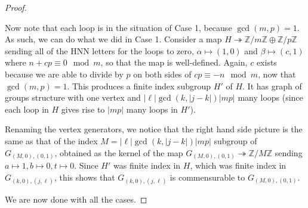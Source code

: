 \documentclass[10pt]{article}
\def\integers{{\mathbb{Z}}}
\theoremstyle{definition}
\begin{document}
\begin{proof}
\begin{enumerate}[(a)]
Now note that  each loop  is in the situation of Case 1, because $\gcd(m,p)=1$. As such, we can do what we did in Case 1. Consider a map $H \twoheadrightarrow \integers/m\integers \oplus \integers/p\integers$ sending all of the HNN letters for the loops to zero, $\alpha \mapsto (1,0)$ and $\beta \mapsto (c,1)$ where $n+cp \equiv 0 \mod m$, so that the map is well-defined. Again, $c$ exists because we are able to divide by $p$ on both sides of $c p \equiv -n \mod m$, now that $\gcd(m,p)=1$. This produces a finite index subgroup $H'$ of $H$. It has graph of groups structure with one vertex and  $|\ell| \gcd(k,|j-k|)|mp|$ many loops (since each loop in $H$ gives rise to $|mp|$ many loops in $H'$). 


Renaming the vertex generators, we notice that the right hand side picture is the same as that of the index $M=|\ell| \gcd(k,|j-k|)|mp|$ subgroup of $G_{(M,0),(0,1)}$, obtained as the kernel of the map $G_{(M,0),(0,1)} \twoheadrightarrow \integers/M\integers$ sending $a \mapsto 1, b\mapsto 0, t\mapsto 0$. Since $H'$ was finite index in $H$, which was finite index in $G_{(k,0),(j,\ell)}$, this shows that $G_{(k,0),(j,\ell)}$ is commensurable to $G_{(M,0),(0,1)}$. 
\end{enumerate}

We are now done with all the cases. 
\end{proof}
\end{document}
